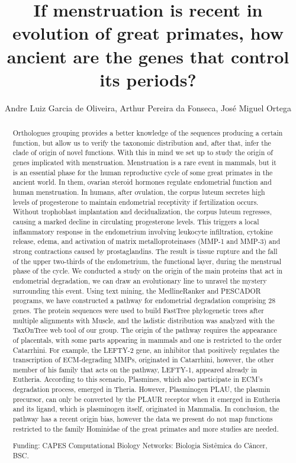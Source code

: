 \documentclass[twoside]{article}
\title{\vspace{-15mm}\fontsize{24pt}{10pt}\selectfont\textbf{ If menstruation is recent in evolution of great primates,  how ancient are the genes that control its periods? }} %
\author{ Andre Luiz Garcia de Oliveira, Arthur Pereira da Fonseca, Jos\'e Miguel Ortega }
\affil{ Universidade Federal de Minas Gerais }
\date{}
\begin{document}
  
  
  \maketitle %
  
  
  \thispagestyle{fancy} %
  
  
  \begin{abstract}
  Orthologues grouping provides a better knowledge of the sequences producing a certain function,  but allow us to verify the taxonomic distribution and,  after that,  infer the clade of origin of novel functions. With this in mind we set up to study the origin of genes implicated with menstruation. Menstruation is a rare event in mammals,  but it is an essential phase for the human reproductive cycle of some great primates in the ancient world. In them,  ovarian steroid hormones regulate endometrial function and human menstruation. In humans,  after ovulation,  the corpus luteum secretes high levels of progesterone to maintain endometrial receptivity if fertilization occurs. Without trophoblast implantation and decidualization,  the corpus luteum regresses,  causing a marked decline in circulating progesterone levels. This triggers a local inflammatory response in the endometrium involving leukocyte infiltration,  cytokine release,  edema,  and activation of matrix metalloproteinases (MMP-1 and MMP-3) and strong contractions caused by prostaglandins. The result is tissue rupture and the fall of the upper two-thirds of the endometrium,  the functional layer,  during the menstrual phase of the cycle. 
We conducted a study on the origin of the main proteins that act in endometrial degradation,  we can draw an evolutionary line to unravel the mystery surrounding this event. Using text mining,  the MedlineRanker and PESCADOR programs,  we have constructed a pathway for endometrial degradation comprising 28 genes. The protein sequences were used to build FastTree phylogenetic trees after multiple alignments with Muscle,  and the ladistic distribution was analyzed with the TaxOnTree web tool of our group.
The origin of the pathway requires the appearance of placentals,  with some parts appearing in mammals and one is restricted to the order Catarrhini. For example,  the LEFTY-2 gene,  an inhibitor that positively regulates the transcription of ECM-degrading MMPs,  originated in Catarrhini,  however,  the other member of his family that acts on the pathway,  LEFTY-1,  appeared already in Eutheria. According to this scenario,  Plasmines,  which also participate in ECM's degradation process,  emerged in Theria. However,  Plasminogen PLAU,  the plasmin precursor,  can only be converted by the PLAUR receptor when it emerged in Eutheria and its ligand,  which is plasminogen itself,  originated in Mammalia. In conclusion,  the pathway has a recent origin bias,  however the data we present do not map functions restricted to the family Hominidae of the great primates and more studies are needed.
  
  Funding: CAPES Computational Biology Networks: Biologia Sist\^emica do C\^ancer,  BSC. \\ 
  \end{abstract}
  
\end{document}
